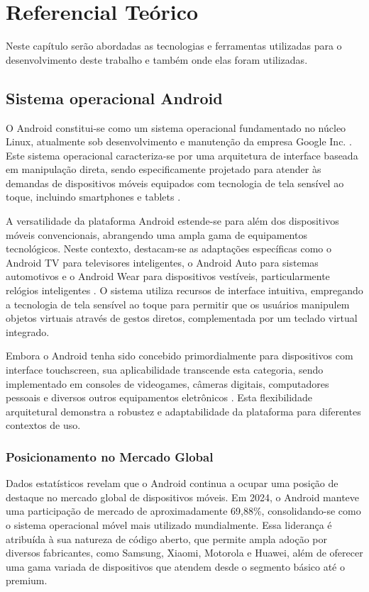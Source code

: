 \chapter{Referencial Teórico}\label{sec:RefTeorico}
Neste capítulo serão abordadas as tecnologias e ferramentas utilizadas para o desenvolvimento deste trabalho e também onde elas foram utilizadas.
\section{Sistema operacional Android}

O Android constitui-se como um sistema operacional fundamentado no núcleo Linux, atualmente sob desenvolvimento e manutenção da empresa Google Inc. \cite{google2023}. Este sistema operacional caracteriza-se por uma arquitetura de interface baseada em manipulação direta, sendo especificamente projetado para atender às demandas de dispositivos móveis equipados com tecnologia de tela sensível ao toque, incluindo smartphones e tablets \cite{burnette2021}.

A versatilidade da plataforma Android estende-se para além dos dispositivos móveis convencionais, abrangendo uma ampla gama de equipamentos tecnológicos. Neste contexto, destacam-se as adaptações específicas como o Android TV para televisores inteligentes, o Android Auto para sistemas automotivos e o Android Wear para dispositivos vestíveis, particularmente relógios inteligentes \cite{ableson2022}. O sistema utiliza recursos de interface intuitiva, empregando a tecnologia de tela sensível ao toque para permitir que os usuários manipulem objetos virtuais através de gestos diretos, complementada por um teclado virtual integrado.

Embora o Android tenha sido concebido primordialmente para dispositivos com interface touchscreen, sua aplicabilidade transcende esta categoria, sendo implementado em consoles de videogames, câmeras digitais, computadores pessoais e diversos outros equipamentos eletrônicos \cite{murphy2023}. Esta flexibilidade arquitetural demonstra a robustez e adaptabilidade da plataforma para diferentes contextos de uso.

\subsection{Posicionamento no Mercado Global}
Dados estatísticos revelam que o Android continua a ocupar uma posição de destaque no mercado global de dispositivos móveis. Em 2024, o Android manteve uma participação de mercado de aproximadamente 69,88\%, consolidando-se como o sistema operacional móvel mais utilizado mundialmente\cite{bankmycell2025}. Essa liderança é atribuída à sua natureza de código aberto, que permite ampla adoção por diversos fabricantes, como Samsung, Xiaomi, Motorola e Huawei, além de oferecer uma gama variada de dispositivos que atendem desde o segmento básico até o premium.

